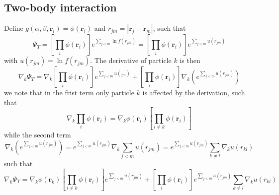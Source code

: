 \documentclass[a4paper, 10pt, english]{revtex4-2} %
\begin{document}
    \subsection*{Two-body interaction}
        Define $g(\alpha, \beta, \mathbf{r}_i) = \phi(\mathbf{r}_i)$ and $r_{jm} = |\mathbf{r}_j - \mathbf{r}_m|$, such that
        \begin{equation}
                \Psi_T 
            =   \left[\prod_i\phi(\mathbf{r}_i)\right] e^{\sum_{j<m} \ln{f(r_{jm})}}
            =   \left[\prod_i\phi(\mathbf{r}_i)\right] e^{\sum_{j<m} u(r_{jm})}
        \end{equation}
        with $u(r_{jm}) = \ln{f(r_{jm})}$. The derivative of particle $k$ is then
        \begin{equation}
                \nabla_k\Psi_T 
            =   \nabla_k\left[\prod_i \phi(\mathbf{r}_i)\right]e^{\sum_{j<m} u(_{jm})} + \left[\prod_i\phi(\mathbf{r}_i)\right] \nabla_k\left(e^{\sum_{j<m} u(r_{jm})}\right)
        \end{equation}
        we note that in the frist term only particle $k$ is affected by the derivation, such that
        \begin{equation}
                \nabla_k\prod_i \phi(\mathbf{r}_i) 
            =   \nabla_k\phi(\mathbf{r}_i)\left[\prod_{i\neq k}\phi(\mathbf{r}_i)\right]
            \label{eq: derphi}
        \end{equation}
        while the second term
        \begin{equation}
                    \nabla_k\left(e^{\sum_{j<m} u(r_{jm})}\right)
                =   e^{\sum_{j<m} u(r_{jm})} \nabla_k\sum_{j<m}u(r_{jm})
                =   e^{\sum_{j<m} u(r_{jm})} \sum_{k\neq l}\nabla_k u(r_{kl})
                \label{eq: dere}
        \end{equation}
        such that
        \begin{equation}
                \nabla_k\Psi_T 
            =   \nabla_k\phi(\mathbf{r}_k)\left[\prod_{i\neq k}\phi(\mathbf{r}_i)\right] e^{\sum_{j<m} u(r_{jm})} + \left[\prod_i\phi(\mathbf{r}_i)\right] e^{\sum_{j<m} u(r_{jm})} \sum_{k\neq l}\nabla_k u(r_{kl})
            \label{eq: first der}
        \end{equation}     
\end{document}
